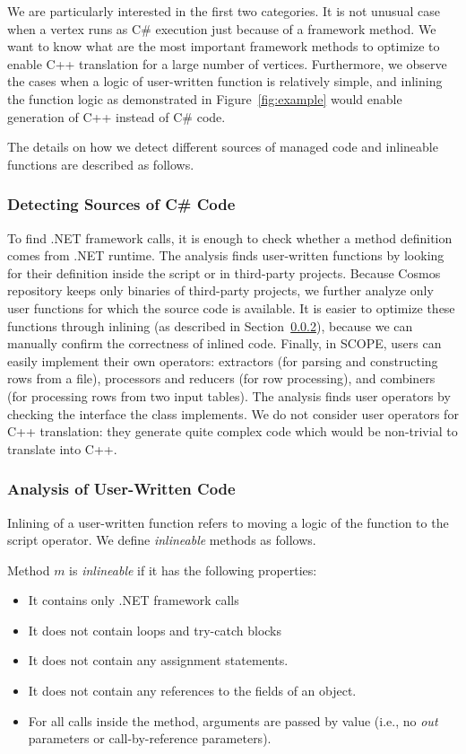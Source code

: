 We are particularly interested in the first two categories. It is not unusual case when a vertex runs as C\# execution just because of a framework method. We want to know what are the most important framework methods to optimize to enable C++ translation for a large number of vertices. Furthermore, we observe the cases when a logic of user-written function is relatively simple, and inlining the function logic as demonstrated in Figure~\ref{fig:example} would enable generation of C++ instead of C\# code. 

The details on how we detect different sources of managed code and inlineable functions are described as follows.

\subsubsection{Detecting Sources of C\# Code}
To find .NET framework calls, it is enough to check whether a method definition comes from .NET runtime. The analysis finds user-written functions by looking for their definition inside the script or in third-party projects. Because Cosmos repository keeps only binaries of third-party projects, we further analyze only user functions for which the source code is available. It is easier to optimize these functions through inlining (as described in Section~\ref{sec:analysisUser}), because we can manually confirm the correctness of inlined code. Finally, in SCOPE, users can easily implement their own operators: extractors (for parsing and constructing rows from a file), processors and reducers (for row processing), and combiners (for processing rows from two input tables). The analysis finds user operators by checking the interface the class implements. We do not consider user operators for C++ translation: they generate quite complex code which would be non-trivial to translate into C++.


\subsubsection{Analysis of User-Written Code}
\label{sec:analysisUser}
Inlining of a user-written function refers to moving a logic of the function to the script operator. We define \emph{inlineable} methods as follows.
\begin{definition}
Method $m$ is \emph{inlineable} if it has the following properties:
\begin{itemize}
\item It contains only .NET framework calls
\item It does not contain loops and try-catch blocks
\item It does not contain any assignment statements.
\item It does not contain any references to the fields of an object.
\item For all calls inside the method, arguments are passed by value (i.e., no {\em out} parameters or call-by-reference parameters).
\end{itemize}


\end{definition}


